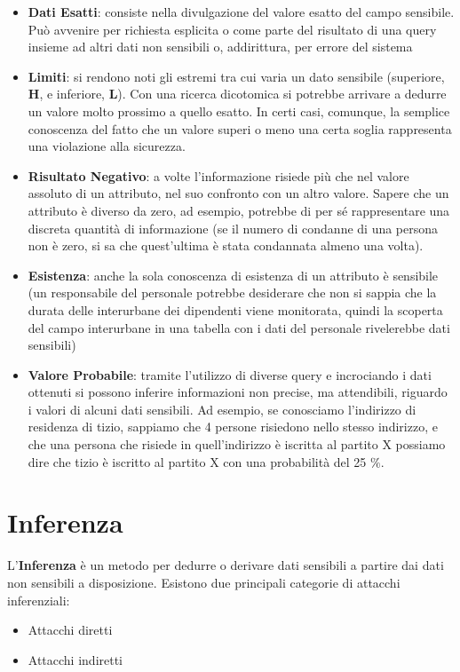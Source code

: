\begin{itemize}
	\item\textbf{Dati Esatti}: consiste nella divulgazione del valore esatto del campo sensibile. Può avvenire per richiesta esplicita o come parte del risultato di una query insieme ad altri dati non sensibili o, addirittura, per errore del sistema
	\item \textbf{Limiti}: si rendono noti gli estremi tra cui varia un dato sensibile (superiore, \textbf{H}, e inferiore, \textbf{L}). Con una ricerca dicotomica si potrebbe arrivare a dedurre un valore molto prossimo a quello esatto. In certi casi, comunque, la semplice conoscenza del fatto che un valore superi o meno una certa soglia rappresenta una violazione alla sicurezza.
	\item \textbf{Risultato Negativo}: a volte l'informazione risiede più che nel valore assoluto di un attributo, nel suo confronto con un altro valore. Sapere che un attributo è diverso da zero, ad esempio, potrebbe di per sé rappresentare una discreta quantità di informazione (se il numero di condanne di una persona non è zero, si sa che quest'ultima è stata condannata almeno una volta).
	\item \textbf{Esistenza}: anche la sola conoscenza di esistenza di un attributo è sensibile (un responsabile del personale potrebbe desiderare che non si sappia che la durata delle interurbane dei dipendenti viene monitorata, quindi la scoperta del campo interurbane in una tabella con i dati del personale rivelerebbe dati sensibili)
	\item \label{par:val_prob} \textbf{Valore Probabile}: tramite l'utilizzo di diverse query e incrociando i dati ottenuti si possono inferire informazioni non precise, ma attendibili, riguardo i valori di alcuni dati sensibili. Ad esempio, se conosciamo l'indirizzo di residenza di tizio, sappiamo che 4 persone risiedono nello stesso indirizzo, e che una persona che risiede in quell'indirizzo è iscritta al partito X possiamo dire che tizio è iscritto al partito X con una probabilità del 25 $\%$.
\end{itemize}

\section{Inferenza}
L'\textbf{Inferenza} è un metodo per dedurre o derivare dati sensibili a partire dai dati non sensibili a disposizione. Esistono due principali categorie di attacchi inferenziali:
\begin{itemize}
	\item Attacchi diretti
	\item Attacchi indiretti
\end{itemize}
